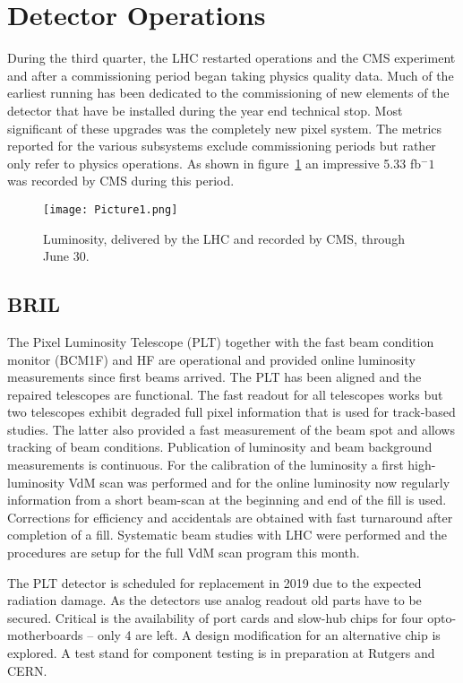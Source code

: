 
\section{Detector Operations}
During the third quarter, the LHC restarted operations and the CMS experiment and after a commissioning period began taking physics quality data. Much of the earliest running has been dedicated to the commissioning of new elements of the detector that have be installed during the  year end technical stop.   Most significant of these upgrades was the completely new pixel system.   The metrics reported for the various subsystems exclude commissioning periods but rather only refer to physics operations.  As shown in figure~\ref{fig:Lumi} an impressive 5.33 fb$^-1$ was recorded by CMS during this period.


\begin{figure}
\begin{center}
\texttt{[image: Picture1.png]}
\caption{Luminosity, delivered by the LHC and recorded by CMS, through June 30.}
\label{fig:Lumi}
\end{center}
\end{figure}

\subsection{BRIL }
The Pixel Luminosity Telescope (PLT) together with the fast beam condition monitor (BCM1F) and HF are operational and provided online luminosity measurements since first beams arrived. The PLT has been aligned and the repaired telescopes are functional. The fast readout for all telescopes works but two telescopes exhibit degraded full pixel information that is used for track-based studies. The latter also provided a fast measurement of the beam spot and allows tracking of beam conditions. Publication of luminosity and beam background measurements is continuous. For the calibration of the luminosity a first high-luminosity VdM scan was performed and for the online luminosity now regularly information from a short beam-scan at the beginning and end of the fill is used. Corrections for efficiency and accidentals are obtained with fast turnaround after completion of a fill. Systematic beam studies with LHC were performed and the procedures are setup for the full VdM scan program this month. 

The PLT detector is scheduled for replacement in 2019 due to the expected radiation damage. As the detectors use analog readout old parts have to be secured. Critical is the availability of port cards and slow-hub chips for four opto-motherboards – only 4 are left. A design modification for an alternative chip is explored. A test stand for component testing is in preparation at Rutgers and CERN.

